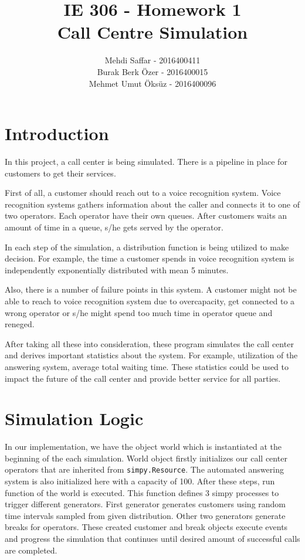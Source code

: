 \documentclass{article}
\title{IE 306 - Homework 1 \\ Call Centre Simulation}
\author{Mehdi Saffar - 2016400411 \\ Burak Berk Özer - 2016400015 \\ Mehmet Umut Öksüz - 2016400096}
\begin{document}
\maketitle

\section{Introduction}
In this project, a call center is being simulated. There is a pipeline in place for customers to get their services.

First of all, a customer should reach out to a voice recognition system. Voice recognition systems gathers
information about the caller and connects it to one of two operators. Each operator have their own queues. After
customers waits an amount of time in a queue, s/he gets served by the operator.

In each step of the simulation, a distribution function is being utilized to make decision. For example, the time a
customer spends in voice recognition system is independently exponentially distributed with mean 5 minutes.

Also, there is a number of failure points in this system. A customer might not be able to reach to voice recognition
system due to overcapacity, get connected to a wrong operator or s/he might spend too much time in operator queue and
reneged.

After taking all these into consideration, these program simulates the call center and derives important statistics
about the system. For example, utilization of the answering system, average total waiting time. These statistics
could be used to impact the future of the call center and provide better service for all parties.

\section{Simulation Logic}
In our implementation, we have the object world which is instantiated at the beginning of the each simulation. World
object firstly initializes our call center operators that are inherited from \texttt{simpy.Resource}. The automated
answering system is also initialized here with a capacity of 100. After these steps, run function of the world is
executed. This function defines 3 simpy processes to trigger different generators. First generator generates
customers using random time intervals sampled from given distribution. Other two generators generate breaks for
operators. These created customer and break objects execute events and progress the simulation that continues until
desired amount of successful calls are completed.
\end{document}
